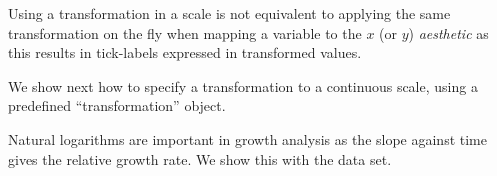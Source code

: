\documentclass[krantz2]{krantz}\usepackage{knitr}
\begin{document}
Using a transformation in a scale is not equivalent to applying the same transformation on the fly when mapping a variable to the $x$  (or $y$) \emph{aesthetic} as this results in tick-labels expressed in transformed values.

\begin{knitrout}\footnotesize
{}\color{fgcolor}\begin{kframe}
\begin{alltt}
   \hlopt{+}
  \hlstd{()}
\end{alltt}
\end{kframe}
\end{knitrout}

We show next how to specify a transformation to a continuous scale, using a predefined ``transformation'' object.

\begin{knitrout}\footnotesize
{}\color{fgcolor}\begin{kframe}
\begin{alltt}
  \hlstd{(} \hlstd{=} \hlstd{)}
\end{alltt}
\end{kframe}
\end{knitrout}

Natural logarithms are important in growth analysis as the slope against time gives the relative growth rate. We show this with the  data set.

\begin{knitrout}\footnotesize
{}\color{fgcolor}\begin{kframe}
\begin{alltt}
\hlstd{(} 
       \hlstd{(}      \hlopt{+}
  \hlstd{()} \hlopt{+}
  \hlstd{()} \hlopt{+}
  \hlstd{(} \hlstd{=} \hlstd{,}  \hlstd{=} \hlstd{(}\hlstd{,} \hlstd{,} \hlstd{,} \hlstd{))}
\end{alltt}
\end{kframe}
\end{knitrout}
\end{document}

